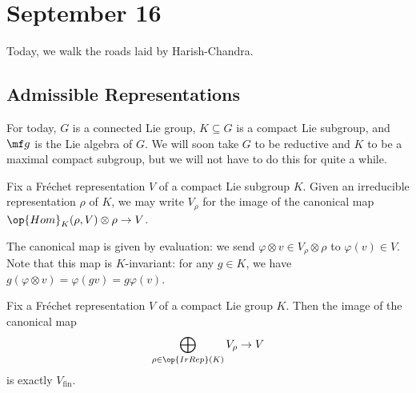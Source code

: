 \documentclass[../notes.tex]{subfiles}
\begin{document}
\section{September 16}
Today, we walk the roads laid by Harish-Chandra.

\subsection{Admissible Representations}
For today, $G$ is a connected Lie group, $K\subseteq G$ is a compact Lie subgroup, and $\mf g$ is the Lie algebra of $G$. We will soon take $G$ to be reductive and $K$ to be a maximal compact subgroup, but we will not have to do this for quite a while.
\begin{notation}
	Fix a Fr\'echet representation $V$ of a compact Lie subgroup $K$. Given an irreducible representation $\rho$ of $K$, we may write $V_\rho$ for the image of the canonical map $\op{Hom}_K(\rho,V)\otimes\rho\to V$.
\end{notation}
\begin{remark}
	The canonical map is given by evaluation: we send $\varphi\otimes v\in V_\rho\otimes\rho$ to $\varphi(v)\in V$. Note that this map is $K$-invariant: for any $g\in K$, we have $g(\varphi\otimes v)=\varphi(gv)=g\varphi(v)$.
\end{remark}
\begin{lemma} \label{lem:decompose-v-fin-isotypic}
	Fix a Fr\'echet representation $V$ of a compact Lie group $K$. Then the image of the canonical map
	\[\bigoplus_{\rho\in\op{IrRep}(K)}V_\rho\to V\]
	is exactly $V_{\mathrm{fin}}$.
\end{lemma}
\end{document}
